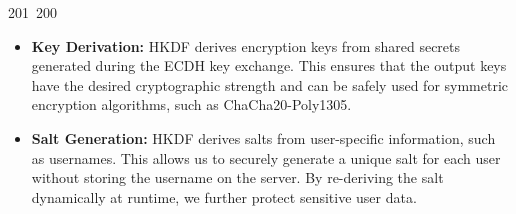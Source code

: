 201~200~\documentclass{article}
\begin{document}
	                                                                                                                                                                                                                                                                                                	                                                                                                                                        	    	                                                                                                	                                                                                                                                                                                                                                                \begin{itemize}
	                                                                                                                                                                                                                                                                                                	                                                                                                                                        	    	                                                                                                	                                                                                                                                                                                                                                                    \item \textbf{Key Derivation:} HKDF derives encryption keys from shared secrets generated during the ECDH key exchange. This ensures that the output keys have the desired cryptographic strength and can be safely used for symmetric encryption algorithms, such as ChaCha20-Poly1305.
	                                                                                                                                                                                                                                                                                                	                                                                                                                                        	    	                                                                                                	                                                                                                                                                                                                                                                        \item \textbf{Salt Generation:} HKDF derives salts from user-specific information, such as usernames. This allows us to securely generate a unique salt for each user without storing the username on the server. By re-deriving the salt dynamically at runtime, we further protect sensitive user data.

\end{itemize}
\end{document}
